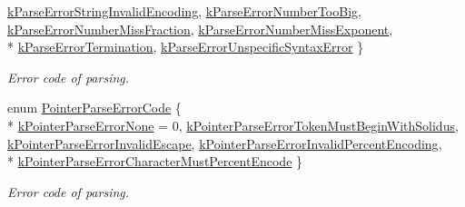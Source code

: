 \begin{DoxyCompactItemize}
\hyperlink{group___r_a_p_i_d_j_s_o_n___e_r_r_o_r_s_gga8d4b32dfc45840bca189ade2bbcb6ba7a17ecb2ed1524b513d64a93f4a7a8b456}{k\+Parse\+Error\+String\+Invalid\+Encoding}, 
\hyperlink{group___r_a_p_i_d_j_s_o_n___e_r_r_o_r_s_gga8d4b32dfc45840bca189ade2bbcb6ba7ae52aaa70fde46e4cc422420309700b82}{k\+Parse\+Error\+Number\+Too\+Big}, 
\hyperlink{group___r_a_p_i_d_j_s_o_n___e_r_r_o_r_s_gga8d4b32dfc45840bca189ade2bbcb6ba7a08a2cc2b4cacfba1673ed536eee229ce}{k\+Parse\+Error\+Number\+Miss\+Fraction}, 
\hyperlink{group___r_a_p_i_d_j_s_o_n___e_r_r_o_r_s_gga8d4b32dfc45840bca189ade2bbcb6ba7a82cdbd740e22b819a70d05e585c2a442}{k\+Parse\+Error\+Number\+Miss\+Exponent}, 
\\*
\hyperlink{group___r_a_p_i_d_j_s_o_n___e_r_r_o_r_s_gga8d4b32dfc45840bca189ade2bbcb6ba7a6fed2d9a15f88540a1ba785f0de2cbe6}{k\+Parse\+Error\+Termination}, 
\hyperlink{group___r_a_p_i_d_j_s_o_n___e_r_r_o_r_s_gga8d4b32dfc45840bca189ade2bbcb6ba7a2bec6b26bddd3e093a37fc0d6399e0be}{k\+Parse\+Error\+Unspecific\+Syntax\+Error}
 \}\begin{DoxyCompactList}\small\item\em Error code of parsing. \end{DoxyCompactList}
\item 
enum \hyperlink{group___r_a_p_i_d_j_s_o_n___e_r_r_o_r_s_gacb2e274f33e54d91b96e9883a99a98be}{Pointer\+Parse\+Error\+Code} \{ \\*
\hyperlink{group___r_a_p_i_d_j_s_o_n___e_r_r_o_r_s_ggacb2e274f33e54d91b96e9883a99a98bea81e2b6fbd1bf4ac890ddb7779265e3a0}{k\+Pointer\+Parse\+Error\+None} = 0, 
\hyperlink{group___r_a_p_i_d_j_s_o_n___e_r_r_o_r_s_ggacb2e274f33e54d91b96e9883a99a98bea5821696a2ab6cbccdc8288cbe6e81c77}{k\+Pointer\+Parse\+Error\+Token\+Must\+Begin\+With\+Solidus}, 
\hyperlink{group___r_a_p_i_d_j_s_o_n___e_r_r_o_r_s_ggacb2e274f33e54d91b96e9883a99a98bea4d2a7e511d717fd1d2f532ef5fcf821b}{k\+Pointer\+Parse\+Error\+Invalid\+Escape}, 
\hyperlink{group___r_a_p_i_d_j_s_o_n___e_r_r_o_r_s_ggacb2e274f33e54d91b96e9883a99a98beac0c1b013c0db34dcc5a47fc1ee7a8c35}{k\+Pointer\+Parse\+Error\+Invalid\+Percent\+Encoding}, 
\\*
\hyperlink{group___r_a_p_i_d_j_s_o_n___e_r_r_o_r_s_ggacb2e274f33e54d91b96e9883a99a98beabd7eae93627f74267009a03679b6dc38}{k\+Pointer\+Parse\+Error\+Character\+Must\+Percent\+Encode}
 \}\begin{DoxyCompactList}\small\item\em Error code of parsing. \end{DoxyCompactList}
\end{DoxyCompactItemize}
